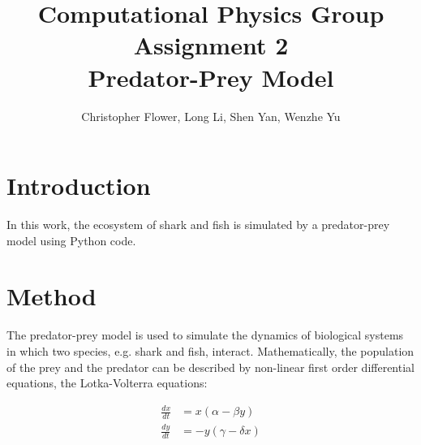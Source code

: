 \documentclass{article}
\begin{document}
\title{\textbf{Computational Physics Group Assignment 2\\Predator-Prey Model}}
\author{Christopher Flower, Long Li, Shen Yan, Wenzhe Yu}
\maketitle

\section{Introduction}
In this work, the ecosystem of shark and fish is simulated by a predator-prey model using Python code.

\section{Method}
The predator-prey model is used to simulate the dynamics of biological systems in which two species, e.g. shark and fish, interact. Mathematically, the population of the prey and the predator can be described by non-linear first order differential equations, the Lotka-Volterra equations:

\begin{align*}
\frac{dx}{dt} & = x(\alpha - \beta y) \\
\frac{dy}{dt} & = -y(\gamma - \delta x)
\end{align*}
\end{document}
